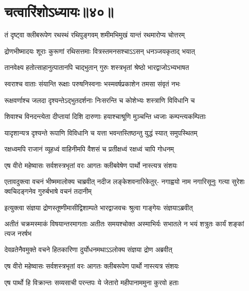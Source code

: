 \chapter{चत्वारिंशोऽध्यायः॥४०॥}

\twolineshloka
{तं दृष्ट्वा क्लीबरूपेण रथस्थं रथिपुङ्गवम्}
{शमीमभिमुखं यान्तं रथमारोप्य चोत्तरम्}


\twolineshloka
{द्रोणभीष्मादयः शूराः कुरूणां रथिसत्तमाः}
{वित्रस्तमनसश्चाऽऽसन् धनञ्जयकृताद् भयात्}


\twolineshloka
{तानवेक्ष्य हतोत्साहानुत्पातानपि चाद्भुतान्}
{गुरुः शस्त्रभृतां श्रेष्ठो भारद्वाजोऽभ्यभाषत}


\twolineshloka
{स्वराश्च वाताः संयान्ति रूक्षाः परुषनिस्वनाः}
{भस्मवर्षप्रकाशेन तमसा संवृतं नभः}


\twolineshloka
{रूक्षवर्णाश्च जलदा दृश्यन्तेऽद्भुतदर्शनाः}
{निःसरन्ति च कोशेभ्यः शस्त्राणि विविधानि च}


\twolineshloka
{शिवाश्च विनदन्त्येता दीप्तायां दिशि दारुणाः}
{हयाश्चाश्रूणि मुञ्चन्ति ध्वजाः कम्पन्त्यकम्पिताः}


\twolineshloka
{यादृशान्यत्र दृश्यन्ते रूपाणि विविधानि च}
{यत्ता भवन्तस्तिष्ठन्तु युद्धं स्यात् समुपस्थितम्}


\twolineshloka
{रक्षध्वमपि राजानं व्यूहध्वं वाहिनीमपि}
{वैशसं च प्रतीक्षध्वं रक्षध्वं चापि गोधनम्}


\twolineshloka
{एष वीरो महेष्वासः सर्वशस्त्रभृतां वरः}
{आगतः क्लीबवेषेण पार्थो नास्त्यत्र संशयः}


\onelineshloka
{एतावदुक्त्वा वचनं भीष्ममालोक्य चाब्रवीत्}
\fourlineindentedshloka
{नदीज लङ्केशवनारिकेतुर्-}
{नगाह्वयो नाम नगारिसूनुः}
{गत्या सुरेशः क्वचिदङ्गनेव}
{गुरुर्बभाषे वचनं तदानीम्}



\twolineshloka
{इत्युक्त्वा संज्ञया द्रोणस्तूष्णीमासीद्विशाम्पते}
{भारद्वाजवचः श्रुत्वा गाङ्गेयः संज्ञयाऽब्रवीत्}


\threelineshloka
{अतीतं चक्रमस्माकं विषयान्तरमागताः}
{अतीतः समयश्चोक्त अस्माभिर्यः सभातले}
{न भयं शत्रुतः कार्यं शङ्कां त्यज नरर्षभ}


\twolineshloka
{देवव्रतेनैवमुक्ते वचने हितकारिणा}
{दुर्योधनमथाऽऽलोक्य संज्ञया द्रोण अब्रवीत्}


\twolineshloka
{एष वीरो महेष्वासः सर्वशस्त्रभृतां वरः}
{आगतः क्लीबरूपेण पार्थो नास्त्यत्र संशयः}


\twolineshloka
{एष पार्थो हि विक्रान्तः सव्यसाची परन्तपः}
{ये जेतारो महीपानाममुना कुरवो हताः}


